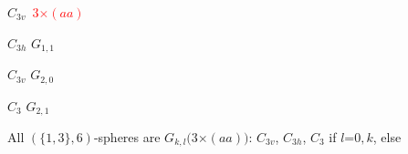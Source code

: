 \documentclass{beamer}
\begin{document}
\begin{frame}
\begin{center}
\begin{minipage}[b]{25mm}
\centering
{}\par
$C_{3v}\,$  \textcolor{red}{$3$$\times$$ (aa)$} 
\end{minipage}
\begin{minipage}[b]{25mm}
\centering
{}\par
$C_{3h}$ $G_{1,1}$ 
\end{minipage}
\begin{minipage}[b]{25mm}
\centering
{}\par
$C_{3v}$ $G_{2,0}$ 
\end{minipage}
\begin{minipage}[b]{25mm}
\centering
{}\par
$C_{3}$  $G_{2,1}$ 
\end{minipage}
\end{center}
All $(\{1,3\},6)$-spheres are $G_{k,l}(3$$\times$$ (aa))$:  $C_{3v}$, 
$C_{3h}$, $C_3$ if $l$=$0,k$, else



\end{frame}
\end{document}
